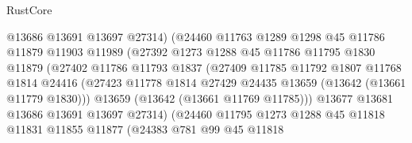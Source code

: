 \begin{lexlean}{RustCore}
\begin{coremodule}
                                @13686
                                @13691
                                @13697
                                @27314)
                              (@24460
                                @11763
                                @1289
                                @1298
                                @45
                                @11786
                                @11879
                                @11903
                                @11989
                                (@27392
                                  @1273
                                  @1288
                                  @45
                                  @11786
                                  @11795
                                  @1830
                                  @11879
                                  (@27402
                                    @11786
                                    @11793
                                    @1837
                                    (@27409
                                      @11785
                                      @11792
                                      @1807
                                      @11768
                                      @1814
                                      @24416
                                      (@27423
                                        @11778
                                        @1814
                                        @27429
                                        @24435
                                        @13659
                                        (@13642 (@13661 @11779 @1830)))
                                      @13659
                                      (@13642 (@13661 @11769 @11785)))
                                    @13677
                                    @13681
                                    @13686
                                    @13691
                                    @13697
                                    @27314)
                                  (@24460
                                    @11795
                                    @1273
                                    @1288
                                    @45
                                    @11818
                                    @11831
                                    @11855
                                    @11877
                                    (@24383
                                      @781
                                      @99
                                      @45
                                      @11818

\end{coremodule}
\end{lexlean}
